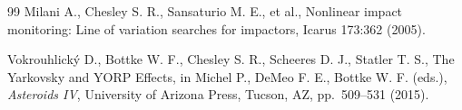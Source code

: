 \begin{thebibliography}{99}
Milani A., Chesley S. R., Sansaturio M. E., et al., Nonlinear impact monitoring: Line of variation searches for impactors, Icarus 173:362 (2005).

Vokrouhlick\'y D., Bottke W. F., Chesley S. R., Scheeres D. J., Statler T. S., The Yarkovsky and YORP Effects, in Michel P., DeMeo F. E., Bottke W. F. (eds.), \textit{Asteroids IV}, University of Arizona Press, Tucson, AZ, pp.~509--531 (2015).

\end{thebibliography}


